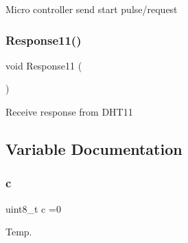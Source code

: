 Micro controller send start pulse/request ~\newline
 

\mbox{\label{dht11_8c_a4bbadf157d9fe443c3592333a9313dfb}} 
\subsubsection{Response11()}
{\footnotesize\ttfamily void Response11 (\begin{DoxyParamCaption}{ }\end{DoxyParamCaption})}



Receive response from D\+H\+T11 ~\newline
 



\subsection{Variable Documentation}
\mbox{\label{dht11_8c_a2e5a04327b5658199f0f7bda2acceee1}} 
\subsubsection{c}
{\footnotesize\ttfamily uint8\+\_\+t c =0}



Temp. 

